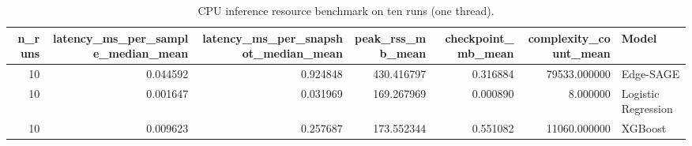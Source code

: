 \begin{table}[tb]
\caption{CPU inference resource benchmark on ten runs (one thread).}
\label{tab:inference-resources}
\begin{tabular}{rrrrrrl}
\toprule
n\_runs & latency\_ms\_per\_sample\_median\_mean & latency\_ms\_per\_snapshot\_median\_mean & peak\_rss\_mb\_mean & checkpoint\_mb\_mean & complexity\_count\_mean & Model \\
\midrule
10 & 0.044592 & 0.924848 & 430.416797 & 0.316884 & 79533.000000 & Edge-SAGE \\
10 & 0.001647 & 0.031969 & 169.267969 & 0.000890 & 8.000000 & Logistic Regression \\
10 & 0.009623 & 0.257687 & 173.552344 & 0.551082 & 11060.000000 & XGBoost \\
\bottomrule
\end{tabular}
\end{table}

